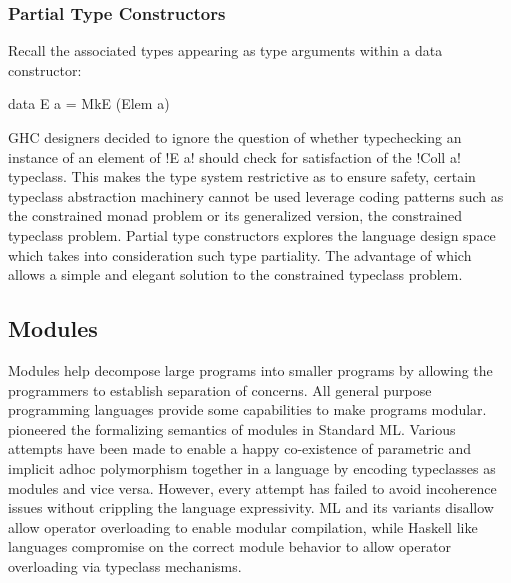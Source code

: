 \documentclass[screen,nonacm,manuscript,review]{acmart} %
\begin{document}
\subsubsection{Partial Type Constructors}
Recall the associated types appearing as type arguments within a data
constructor:

\begin{CenteredBox}
\begin{code}
data E a = MkE (Elem a)
\end{code}
\end{CenteredBox}

GHC designers decided to ignore the question of whether typechecking
an instance of an element of !E a! should check for satisfaction of
the !Coll a! typeclass. This makes the type system restrictive as to
ensure safety, certain typeclass abstraction machinery cannot be used
leverage coding patterns such as the constrained monad
problem\cite{sculthorpe_constrained-monad_2013} or its generalized
version, the constrained typeclass problem. Partial type
constructors\cite{jones_partial_2019,ingle_partial_2022} explores the language design
space which takes into consideration such type partiality. The
advantage of which allows a simple and elegant solution to the
constrained typeclass problem.

\subsection{Modules}\label{sec:rw-modules}
Modules help decompose large programs into smaller programs by allowing the programmers to establish separation of concerns. All general purpose programming languages provide some capabilities to make programs modular. \citet{macqueen_modules_1984} pioneered the formalizing semantics of modules in Standard ML.
Various attempts\cite{dreyer_modular_2007, wehr_ml_2008, white_modular_2014} have been made to enable a happy co-existence of parametric and implicit adhoc polymorphism together in a language by encoding typeclasses as modules and vice versa. However, every attempt has failed to avoid incoherence issues without crippling the language expressivity. ML and its variants\cite{milner_definition_1997,leroy_ocaml_2023} disallow allow operator overloading to enable modular compilation, while Haskell like languages compromise on the correct module behavior to allow operator overloading via typeclass mechanisms.
\end{document}
